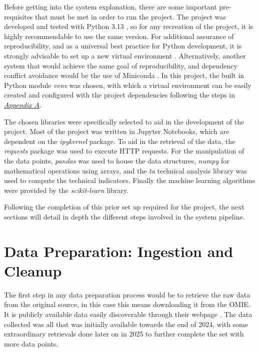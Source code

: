 \documentclass[12pt]{report} %
\begin{document}
Before getting into the system explanation, there are some important pre-requisites that must be met in order to run the project. The project was developed and tested with Python 3.13 \cite{python3.13}, so for any recreation of the project, it is highly recommendable to use the same version. For additional assurance of reproducibility, and as a universal best practice for Python development, it is strongly advisable to set up a new virtual environment \cite{python_venv}. Alternatively, another system that would achieve the same goal of reproducibility, and dependency conflict avoidance would be the use of Miniconda \cite{conda}. In this project, the built in Python module \textit{venv} was chosen, with which a virtual environment can be easily created and configured with the project dependencies following the steps in \textit{\hyperref[app:appendix_a_env_setup]{Appendix A}}.

The chosen libraries were specifically selected to aid in the development of the project. Most of the project was written in Jupyter Notebooks, which are dependent on the \textit{ipykernel} package. To aid in the retrieval of the data, the \textit{requests} package was used to execute HTTP requests. For the manipulation of the data points, \textit{pandas} was used to house the data structures, \textit{numpy} for mathematical operations using arrays, and the \textit{ta} technical analysis library was used to compute the technical indicators. Finally the machine learning algorithms were provided by the \textit{scikit-learn} library.

Following the completion of this prior set up required for the project, the next sections will detail in depth the different steps involved in the system pipeline.



\section{Data Preparation: Ingestion and Cleanup}


The first step in any data preparation process would be to retrieve the raw data from the original source, in this case this means downloading it from the OMIE. It is publicly available data easily discoverable through their webpage \cite{omie_datos}. The data collected was all that was initially available towards the end of 2024, with some extraordinary retrievals done later on in 2025 to further complete the set with more data points.
\end{document}
